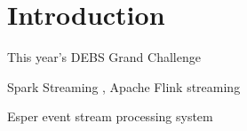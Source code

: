 
\section{Introduction}


This year's DEBS Grand Challenge \cite{debs2022challenge}









Spark Streaming \cite{Spark}, Apache Flink streaming \cite{Flink}

Esper event stream processing system \cite{Bernhardt2007}


